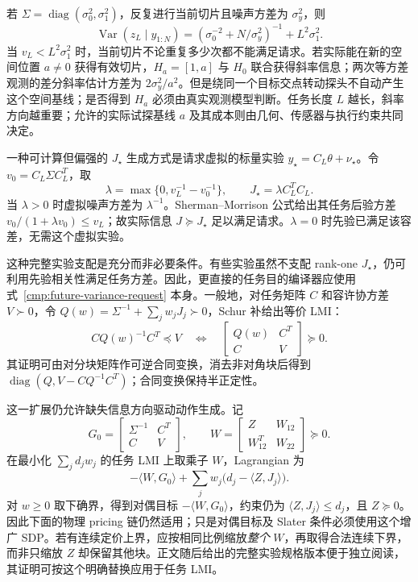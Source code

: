 \documentclass[11pt,a4paper]{article}
\numberwithin{equation}{section}
\theoremstyle{definition}
\begin{document}
若 $\Sigma=\operatorname{diag}(\sigma_0^2,\sigma_1^2)$，反复进行当前切片且噪声方差为 $\sigma_y^2$，则
\begin{equation}
 \operatorname{Var}(z_L\mid y_{1:N})
 =\left(\sigma_0^{-2}+N/\sigma_y^2\right)^{-1}
   +L^2\sigma_1^2.
 \label{cmp:slope-floor}
\end{equation}
当 $v_L<L^2\sigma_1^2$ 时，当前切片不论重复多少次都不能满足请求。若实际能在新的空间位置 $a\ne0$ 获得有效切片，$H_a=[1,a]$ 与 $H_0$ 联合获得斜率信息；两次等方差观测的差分斜率估计方差为 $2\sigma_y^2/a^2$。但是绕同一个目标交点转动探头不自动产生这个空间基线；是否得到 $H_a$ 必须由真实观测模型判断。任务长度 $L$ 越长，斜率方向越重要；允许的实际试探基线 $a$ 及其成本则由几何、传感器与执行约束共同决定。

一种可计算但偏强的 $J_\star$ 生成方式是请求虚拟的标量实验 $y_\star=C_L\theta+\nu_\star$。令 $v_0=C_L\Sigma C_L^T$，取
\begin{equation}
 \lambda=\max\{0,v_L^{-1}-v_0^{-1}\},\qquad
 J_\star=\lambda C_L^TC_L.
 \label{cmp:virtual-request}
\end{equation}
当 $\lambda>0$ 时虚拟噪声方差为 $\lambda^{-1}$。Sherman--Morrison 公式给出其任务后验方差
$v_0/(1+\lambda v_0)\le v_L$；故实际信息 $J\succeq J_\star$ 足以满足请求。$\lambda=0$ 时先验已满足该容差，无需这个虚拟实验。

这种完整实验支配是充分而非必要条件。有些实验虽然不支配 rank-one $J_\star$，仍可利用先验相关性满足任务方差。因此，更直接的任务目的编译器应使用式~\eqref{cmp:future-variance-request} 本身。一般地，对任务矩阵 $C$ 和容许协方差 $V\succ0$，令
$Q(w)=\Sigma^{-1}+\sum_jw_jJ_j\succ0$，Schur 补给出等价 LMI：
\begin{equation}
 C Q(w)^{-1}C^T\preceq V
 \quad\Longleftrightarrow\quad
 \begin{bmatrix}Q(w)&C^T\\C&V\end{bmatrix}\succeq0.
 \label{cmp:task-lmi}
\end{equation}
其证明可由对分块矩阵作可逆合同变换，消去非对角块后得到
$\operatorname{diag}(Q,V-CQ^{-1}C^T)$；合同变换保持半正定性。

这一扩展仍允许缺失信息方向驱动动作生成。记
\begin{equation}
 G_0=\begin{bmatrix}\Sigma^{-1}&C^T\\C&V\end{bmatrix},
 \qquad
 W=\begin{bmatrix}Z&W_{12}\\W_{12}^T&W_{22}\end{bmatrix}\succeq0.
\end{equation}
在最小化 $\sum_jd_jw_j$ 的任务 LMI 上取乘子 $W$，Lagrangian 为
\begin{equation}
 -\langle W,G_0\rangle
   +\sum_jw_j\bigl(d_j-\langle Z,J_j\rangle\bigr).
\end{equation}
对 $w\ge0$ 取下确界，得到对偶目标 $-\langle W,G_0\rangle$，约束仍为
$\langle Z,J_j\rangle\le d_j$，且 $Z\succeq0$。因此下面的物理 pricing 链仍然适用；只是对偶目标及 Slater 条件必须使用这个增广 SDP。若有连续定价上界，应按相同比例缩放\emph{整个} $W$，再取得合法连续下界，而非只缩放 $Z$ 却保留其他块。正文随后给出的完整实验规格版本便于独立阅读，其证明可按这个明确替换应用于任务 LMI。
\end{document}
